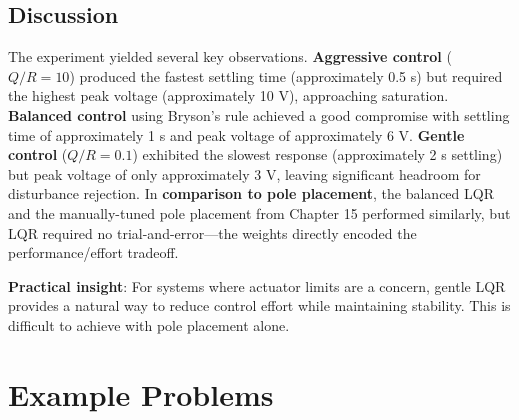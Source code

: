\subsection{Discussion}

The experiment yielded several key observations. \textbf{Aggressive control} ($Q/R = 10$) produced the fastest settling time (approximately 0.5 s) but required the highest peak voltage (approximately 10 V), approaching saturation. \textbf{Balanced control} using Bryson's rule achieved a good compromise with settling time of approximately 1 s and peak voltage of approximately 6 V. \textbf{Gentle control} ($Q/R = 0.1$) exhibited the slowest response (approximately 2 s settling) but peak voltage of only approximately 3 V, leaving significant headroom for disturbance rejection. In \textbf{comparison to pole placement}, the balanced LQR and the manually-tuned pole placement from Chapter 15 performed similarly, but LQR required no trial-and-error---the weights directly encoded the performance/effort tradeoff.

\textbf{Practical insight}: For systems where actuator limits are a concern, gentle LQR provides a natural way to reduce control effort while maintaining stability. This is difficult to achieve with pole placement alone.


\section{Example Problems}
\label{sec:lqr_examples}

